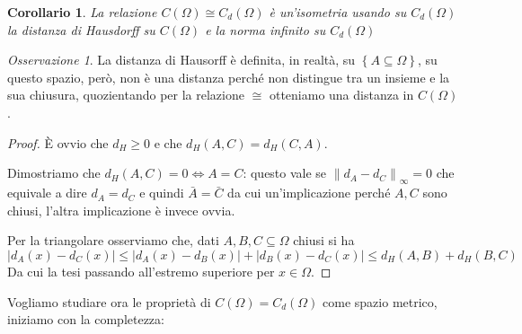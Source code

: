 \documentclass[a4paper,10pt]{article}
\theoremstyle{plain}
\newtheorem{mycor}{Corollario}[section]
\theoremstyle{definition}
\theoremstyle{remark}
\newtheorem{myoss}{Osservazione}[section]
\newcommand{\set}[1]{\left\{#1\right\}}
\newcommand{\abs}[1]{\left|#1\right|}
\newcommand{\norm}[1]{\left\|#1\right\|}
\begin{document}
\begin{mycor}
  La relazione $C(\Omega) \cong C_d(\Omega)$ è un'isometria usando su
  $C_d(\Omega)$ la distanza di Hausdorff su $C(\Omega)$ e la norma
  infinito su $C_d(\Omega)$
\end{mycor}

\begin{myoss}
  La distanza di Hausorff è definita, in realtà, su $\set{A \subseteq
    \Omega}$, su questo spazio, però, non è una distanza perché non
  distingue tra un insieme e la sua chiusura, quozientando per la
  relazione $\cong$ otteniamo una distanza in $C(\Omega)$.
\end{myoss}
\begin{proof}
  È ovvio che $d_H \ge 0$ e che $d_H(A,C) = d_H(C,A)$.

  Dimostriamo che $d_H(A,C) = 0 \Leftrightarrow A = C$: questo vale se
  $\norm{d_A - d_C}_\infty = 0$ che equivale a dire $d_A = d_C$ e
  quindi $\bar A = \bar C$ da cui un'implicazione perché $A,C$ sono
  chiusi, l'altra implicazione è invece ovvia.

  Per la triangolare osserviamo che, dati $A,B,C \subseteq \Omega$
  chiusi si ha
  \[ \abs{d_A(x) - d_C(x)} \le \abs{d_A(x) - d_B(x)} + \abs{d_B(x) -
    d_C(x)} \le d_H(A,B) + d_H(B,C) \]
  Da cui la tesi passando all'estremo superiore per $x\in \Omega$.
\end{proof}

Vogliamo studiare ora le propriet\`a di $C(\Omega) = C_d(\Omega)$ come
spazio metrico, iniziamo con la completezza:
\end{document}
